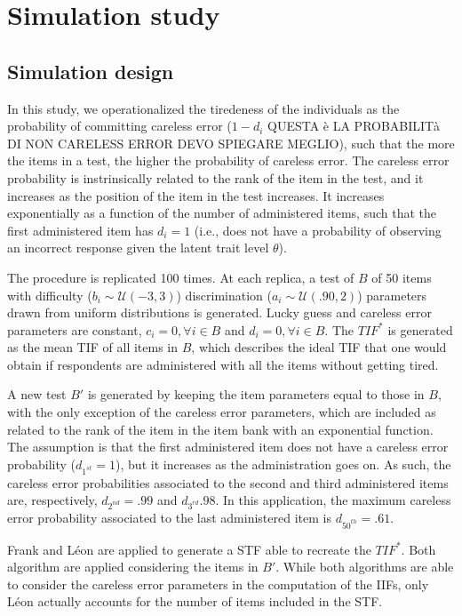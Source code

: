 \documentclass{svproc}
\begin{document}
\section{Simulation study}

\subsection{Simulation design}

In this study, we operationalized the tiredeness of the individuals as the probability of committing careless error ($1- d_i$ QUESTA è LA PROBABILITà DI NON CARELESS ERROR DEVO SPIEGARE MEGLIO), such that the more the items in a test, the higher the probability of careless error. 
The careless error probability is instrinsically related to the rank of the item in the test, and it increases as the position of the item in the test increases. It increases exponentially as a function of the number of administered items, such that the first administered item has $d_i = 1$ (i.e., does not have a probability of observing an incorrect response given the latent trait level $\theta$).

The procedure is replicated 100 times. At each replica, a test of $B$ of 50 items with difficulty ($b_i \sim \mathcal{U}(-3, 3)$) discrimination ($a_i \sim \mathcal{U}(.90, 2)$) parameters drawn from uniform distributions is generated. Lucky 
guess and careless error parameters are constant, $c_i = 0, \forall i \in B$ and $d_i = 0, \forall i \in B$.
The $TIF^*$ is generated as the mean TIF of all items in $B$, which describes the ideal TIF that one would obtain if respondents are administered with all the items without getting tired. 

A new test $B'$ is generated by keeping the item parameters equal to those in $B$, with the only exception of the careless error parameters, which are included as related to the rank of the item in the item bank with an exponential function. 
The assumption is that the first administered item does not have a careless error probability ($d_{1^{st}} = 1$), but it increases as the administration goes on. As such, the careless error probabilities associated to the second and third administered items are, respectively, $d_{2^{nd}} = .99$ and $d_{3^{rd}}.98$. In this application, the maximum careless error probability associated to the last administered item is $d_{50^{th}} = .61$.

\color{blue}
Frank and Léon are applied to generate a STF able to recreate the $TIF^*$. Both algorithm are applied considering the items in $B'$. While both algorithms are able to consider the careless error parameters in the computation of the IIFs, only Léon actually accounts for the number of items included in the STF.
\end{document}
